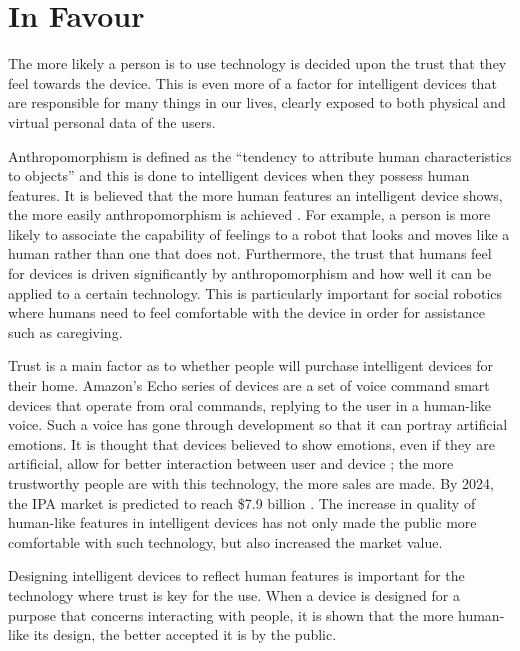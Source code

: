 \documentclass{article}
\begin{document}
\section{In Favour}
The more likely a person is to use technology is decided upon the trust that they feel towards the device. This is even more of a factor for intelligent devices that are responsible for many things in our lives, clearly exposed to both physical and virtual personal data of the users.\par
Anthropomorphism is defined as the “tendency to attribute human characteristics to objects” \cite{woods2004anthropomorphism} and this is done to intelligent devices when they possess human features. It is believed that the more human features an intelligent device shows, the more easily anthropomorphism is achieved \cite{vanPinxteren2019features}. For example, a person is more likely to associate the capability of feelings to a robot that looks and moves like a human rather than one that does not. Furthermore, the trust that humans feel for devices is driven significantly by anthropomorphism \cite{woods2004anthropomorphism} and how well it can be applied to a certain technology. This is particularly important for social robotics where humans need to feel comfortable with the device in order for assistance such as caregiving.\par
Trust is a main factor as to whether people will purchase intelligent devices for their home. Amazon’s Echo series of devices are a set of voice command smart devices that operate from oral commands, replying to the user in a human-like voice. Such a voice has gone through development so that it can portray artificial emotions. It is thought that devices believed to show emotions, even if they are artificial, allow for better interaction between user and device \cite{buiu2011emotions}; the more trustworthy people are with this technology, the more sales are made. By 2024, the IPA market is predicted to reach \$7.9 billion \cite{tmr2016market}. The increase in quality of human-like features in intelligent devices has not only made the public more comfortable with such technology, but also increased the market value.\par
Designing intelligent devices to reflect human features is important for the technology where trust is key for the use. When a device is designed for a purpose that concerns interacting with people, it is shown that the more human-like its design, the better accepted it is by the public.
\end{document}
